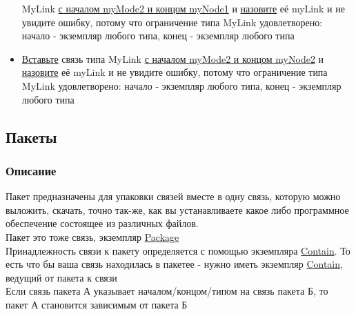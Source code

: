 \documentclass{article}
\begin{document}
\begin{itemize}
        MyLink
        \hyperlink{FAQ.HowToInsertLinkWithFromAndTo}{с началом myMode2 и
          концом
          myNode1} и \hyperlink{FAQ.HowToSetName}{назовите} её myLink и
        не
        увидите
        ошибку, потому что ограничение типа MyLink удовлетворено: начало -
        экземпляр
        любого типа, конец - экземпляр любого типа
  \item \hyperlink{DeepCase.InsertLink.Description}{Вставьте} связь типа
        MyLink
        \hyperlink{FAQ.HowToInsertLinkWithFromAndTo}{с началом myMode2 и
          концом
          myNode2} и \hyperlink{FAQ.HowToSetName}{назовите} её myLink и
        не
        увидите
        ошибку, потому что ограничение типа MyLink удовлетворено: начало -
        экземпляр
        любого типа, конец - экземпляр любого типа
\end{itemize}
\subsection{Пакеты}
\subsubsection{Описание}
Пакет предназначены для упаковки связей вместе в одну связь, которую можно
выложить, скачать, точно так-же, как вы устанавливаете какое либо программное
обеспечение состоящее из различных файлов. \\
Пакет это тоже связь, экземпляр \hyperlink{Core.Package}{Package} \\
Принадлежность связи к пакету определяется с помощью экземпляра
\hyperlink{Core.Contain.Description}{Contain}. То есть что бы ваша связь
находилась в
пакетее - нужно иметь экземпляр \hyperlink{Core.Contain.Description}{Contain},
ведущий
от пакета к связи \\
Если связь пакета А указывает началом/концом/типом на связь пакета Б, то пакет
А становится зависимым от пакета Б \\
\end{document}

